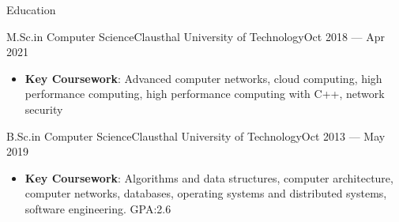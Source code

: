 \documentclass[]{mcdowellcv}
\begin{document}
\makeheader%

\begin{cvsection}{Education}
\begin{cvsubsection}{M.Sc.\@ in Computer Science}{Clausthal University of Technology}{Oct 2018 --- Apr 2021}
\bigskip
\begin{itemize}
\item \textbf{Key Coursework}: Advanced computer networks, cloud computing, high performance computing, high performance computing with C++, network security
\end{itemize}
\end{cvsubsection}
\begin{cvsubsection}{B.Sc.\@ in Computer Science}{Clausthal University of Technology}{Oct 2013 --- May 2019}
\bigskip
\begin{itemize}
\item \textbf{Key Coursework}: Algorithms and data structures, computer architecture, computer networks, databases, operating systems and distributed systems, software engineering. GPA:\@ 2.6
\end{itemize}
\end{cvsubsection}


\end{cvsection}
\end{document}
